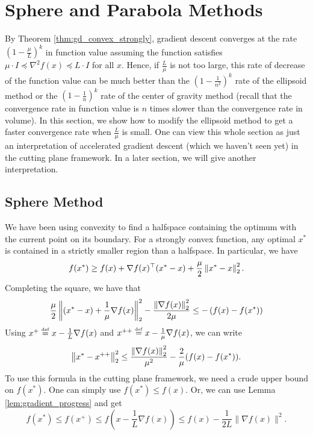 
\section{Sphere and Parabola Methods}

By Theorem \ref{thm:gd_convex_strongly}, gradient descent converges
at the rate $(1-\frac{\mu}{L})^{k}$ in function value assuming the
function satisfies $\mu\cdot I\preceq\nabla^{2}f(x)\preceq L\cdot I$
for all $x$. Hence, if $\frac{L}{\mu}$ is not too large, this rate
of decrease of the function value can be much better than the $\left(1-\frac{1}{n^{2}}\right)^{k}$
rate of the ellipsoid method or the $\left(1-\frac{1}{n}\right)^{k}$
rate of the center of gravity method (recall that the convergence
rate in function value is $n$ times slower than the convergence rate
in volume). In this section, we show how to modify the ellipsoid method
to get a faster convergence rate when $\frac{L}{\mu}$ is small. One
can view this whole section as just an interpretation of accelerated
gradient descent (which we haven't seen yet) in the cutting plane
framework. In a later section, we will give another interpretation.

\subsection{Sphere Method}

We have been using convexity to find a halfspace containing the optimum
with the current point on its boundary. For a strongly convex function,
any optimal $x^{*}$ is contained in a strictly smaller region than
a halfspace. In particular, we have
\[
f(x^{*})\geq f(x)+\nabla f(x)^{\top}(x^{*}-x)+\frac{\mu}{2}\left\Vert x^{*}-x\right\Vert^{2}_{2}.
\]
Completing the square, we have that
\[
\frac{\mu}{2}\left\Vert (x^{*}-x)+\frac{1}{\mu}\nabla f(x)\right\Vert^{2}_{2}-\frac{\left\Vert \nabla f(x)\right\Vert^{2}_{2}}{2\mu}\le-\left(f(x)-f(x^{*})\right)
\]
Using $x^{+}\stackrel{\mathrm{{\scriptscriptstyle def}}}{=} x-\frac{1}{L}\nabla f(x)$ and $x^{++}\stackrel{\mathrm{{\scriptscriptstyle def}}}{=} x-\frac{1}{\mu}\nabla f(x)$,
we can write
\begin{equation}
\left\Vert x^{*}-x^{++}\right\Vert^{2}_{2}\leq\frac{\left\Vert \nabla f(x)\right\Vert^{2}_{2}}{\mu^{2}}-\frac{2}{\mu}(f(x)-f(x^{*})).\label{eq:geometricdescent_ball-1}
\end{equation}
To use this formula in the cutting plane framework, we need a crude
upper bound on $f(x^{*})$. One can simply use $f(x^{*})\leq f(x)$.
Or, we can use Lemma \ref{lem:gradient_progress} and get
\[
f(x^{*})\leq f(x^{+})\le f(x-\frac{1}{L}\nabla f(x))\leq f(x)-\frac{1}{2L}\|\nabla f(x)\|^{2}.
\]


